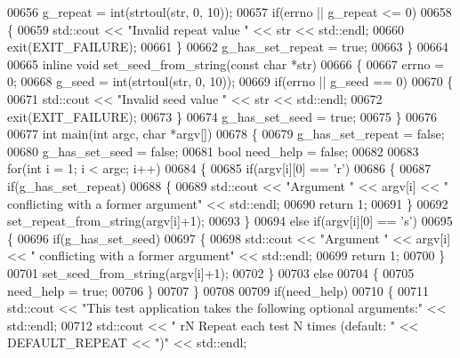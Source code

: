 \begin{DoxyCode}
00656   g\_repeat = int(strtoul(str, 0, 10));
00657   \textcolor{keywordflow}{if}(errno || g\_repeat <= 0)
00658   \{
00659     std::cout << \textcolor{stringliteral}{"Invalid repeat value "} << str << std::endl;
00660     exit(EXIT\_FAILURE);
00661   \}
00662   g\_has\_set\_repeat = \textcolor{keyword}{true};
00663 \}
00664 
00665 \textcolor{keyword}{inline} \textcolor{keywordtype}{void} set\_seed\_from\_string(\textcolor{keyword}{const} \textcolor{keywordtype}{char} *str)
00666 \{
00667   errno = 0;
00668   g\_seed = int(strtoul(str, 0, 10));
00669   \textcolor{keywordflow}{if}(errno || g\_seed == 0)
00670   \{
00671     std::cout << \textcolor{stringliteral}{"Invalid seed value "} << str << std::endl;
00672     exit(EXIT\_FAILURE);
00673   \}
00674   g\_has\_set\_seed = \textcolor{keyword}{true};
00675 \}
00676 
00677 \textcolor{keywordtype}{int} main(\textcolor{keywordtype}{int} argc, \textcolor{keywordtype}{char} *argv[])
00678 \{
00679     g\_has\_set\_repeat = \textcolor{keyword}{false};
00680     g\_has\_set\_seed = \textcolor{keyword}{false};
00681     \textcolor{keywordtype}{bool} need\_help = \textcolor{keyword}{false};
00682 
00683     \textcolor{keywordflow}{for}(\textcolor{keywordtype}{int} i = 1; i < argc; i++)
00684     \{
00685       \textcolor{keywordflow}{if}(argv[i][0] == \textcolor{charliteral}{'r'})
00686       \{
00687         \textcolor{keywordflow}{if}(g\_has\_set\_repeat)
00688         \{
00689           std::cout << \textcolor{stringliteral}{"Argument "} << argv[i] << \textcolor{stringliteral}{" conflicting with a former argument"} << std::endl;
00690           \textcolor{keywordflow}{return} 1;
00691         \}
00692         set\_repeat\_from\_string(argv[i]+1);
00693       \}
00694       \textcolor{keywordflow}{else} \textcolor{keywordflow}{if}(argv[i][0] == \textcolor{charliteral}{'s'})
00695       \{
00696         \textcolor{keywordflow}{if}(g\_has\_set\_seed)
00697         \{
00698           std::cout << \textcolor{stringliteral}{"Argument "} << argv[i] << \textcolor{stringliteral}{" conflicting with a former argument"} << std::endl;
00699           \textcolor{keywordflow}{return} 1;
00700         \}
00701          set\_seed\_from\_string(argv[i]+1);
00702       \}
00703       \textcolor{keywordflow}{else}
00704       \{
00705         need\_help = \textcolor{keyword}{true};
00706       \}
00707     \}
00708 
00709     \textcolor{keywordflow}{if}(need\_help)
00710     \{
00711       std::cout << \textcolor{stringliteral}{"This test application takes the following optional arguments:"} << std::endl;
00712       std::cout << \textcolor{stringliteral}{"  rN     Repeat each test N times (default: "} << DEFAULT\_REPEAT << \textcolor{stringliteral}{")"} << std::endl;

\end{DoxyCode}
